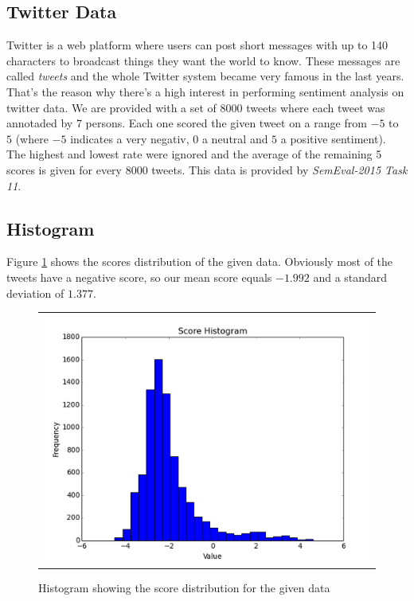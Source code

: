\subsection{Twitter Data} %
\label{sub:twitter_data}
Twitter is a web platform where users can post short messages with up to 140 characters to broadcast things they want the world to know. These messages are called \textit{tweets} and the whole Twitter system became very famous in the last years. That's the reason why there's a high interest in performing sentiment analysis on twitter data. We are provided with a set of 8000 tweets where each tweet was annotaded by 7 persons. Each one scored the given tweet on a range from $-5$ to $5$ (where $-5$ indicates a very negativ, $0$ a neutral and $5$ a positive sentiment). The highest and lowest rate were ignored and the average of the remaining 5 scores is given for every 8000 tweets. This data is provided by \textit{SemEval-2015 Task 11}.

\subsection{Histogram} %
\label{sub:histogram}
Figure \ref{fig:hist_data} shows the scores distribution of the given data. Obviously most of the tweets have a negative score, so our mean score equals $-1.992$ and a standard deviation of $1.377$.

\begin{figure}[ht]
\centering 
  \begin{tabular}{@{}l@{}}
    \includegraphics[width=0.6\linewidth]{img/data_hist.png}
  \end{tabular} 
  \caption{Histogram showing the score distribution for the given data} 
  \label{fig:hist_data} 
\end{figure}


